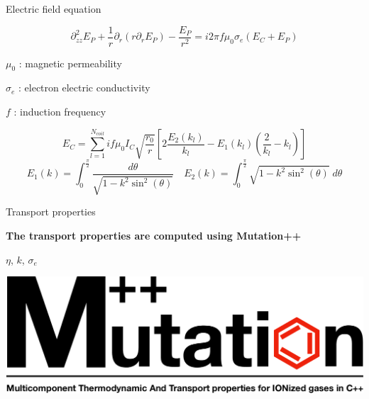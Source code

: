 \documentclass[24pt,t,table, aspectratio=169]{beamer}
\begin{document}
\begin{frame}{Electric field equation}

\begin{framed}
\begin{equation*}
\partial^2_{zz} E_P + \frac{1}{r}\partial_r (r \partial_r E_P) - \frac{E_P}{r^2} = i 2 \pi f\mu_0\sigma_e \left(E_C + E_P\right)
\end{equation*}
\end{framed}

{
$\mu_0$ : magnetic permeability

$\sigma_e$ : electron electric conductivity

$f$ : induction frequency
}

{
\begin{equation*}
	E_C = \sum_{l=1}^{N_{coil}} i f \mu_0 I_C \sqrt{\frac{r_0}{r}}\left[2 \frac{E_2(k_l)}{k_l} - E_1(k_l)\left(\frac{2}{k_l}-k_l\right)\right]
\end{equation*}
\begin{equation*}
		E_1(k) = \int_0^{\frac{\pi}{2}} \frac{d\theta}{\sqrt{1-k^2 \sin^2(\theta)}} \quad E_2(k) = \int_0^{\frac{\pi}{2}} \sqrt{1-k^2 \sin^2(\theta)} \; d\theta
\end{equation*}
}

\end{frame}

\begin{frame}{Transport properties}

\begin{framed}
\centering
\textbf{The transport properties are computed using Mutation++}

$\eta$, $k$, $\sigma_e$ 
\end{framed}

\begin{center}
\includegraphics[width=\linewidth]{./mpp-logo.png}
\end{center}

\end{frame}
\end{document}
